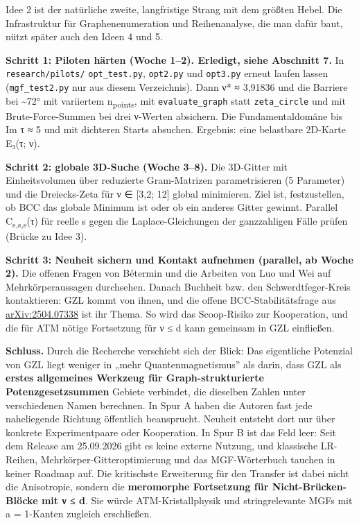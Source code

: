 Idee 2 ist der natürliche zweite, langfristige Strang mit dem größten Hebel. Die Infrastruktur für Graphenenumeration und Reihenanalyse, die man dafür baut, nützt später auch den Ideen 4 und 5.

\textbf{Schritt 1: Piloten härten (Woche 1--2). Erledigt, siehe Abschnitt 7.} In \texttt{research/pilots/} \texttt{opt\_test.py}, \texttt{opt2.py} und \texttt{opt3.py} erneut laufen lassen (\texttt{mgf\_test2.py} nur aus diesem Verzeichnis). Dann ν* ≈ 3,91836 und die Barriere bei \textasciitilde72° mit variiertem n\textsubscript{points}, mit \texttt{evaluate\_graph} statt \texttt{zeta\_circle} und mit Brute-Force-Summen bei drei ν-Werten absichern. Die Fundamentaldomäne bis Im τ ≈ 5 und mit dichteren Starts absuchen. Ergebnis: eine belastbare 2D-Karte E₃(τ; ν).

\textbf{Schritt 2: globale 3D-Suche (Woche 3--8).} Die 3D-Gitter mit Einheitsvolumen über reduzierte Gram-Matrizen parametrisieren (5 Parameter) und die Dreiecks-Zeta für ν ∈ {[}3,2; 12{]} global minimieren. Ziel ist, festzustellen, ob BCC das globale Minimum ist oder ob ein anderes Gitter gewinnt. Parallel C\textsubscript{s,s,s}(τ) für reelle s gegen die Laplace-Gleichungen der ganzzahligen Fälle prüfen (Brücke zu Idee 3).

\textbf{Schritt 3: Neuheit sichern und Kontakt aufnehmen (parallel, ab Woche 2).} Die offenen Fragen von Bétermin und die Arbeiten von Luo und Wei auf Mehrkörperaussagen durchsehen. Danach Buchheit bzw. den Schwerdtfeger-Kreis kontaktieren: GZL kommt von ihnen, und die offene BCC-Stabilitätsfrage aus \href{https://arxiv.org/abs/2504.07338}{arXiv:2504.07338} ist ihr Thema. So wird das Scoop-Risiko zur Kooperation, und die für ATM nötige Fortsetzung für ν ≤ d kann gemeinsam in GZL einfließen.

\textbf{Schluss.} Durch die Recherche verschiebt sich der Blick: Das eigentliche Potenzial von GZL liegt weniger in „mehr Quantenmagnetismus'' als darin, dass GZL als \textbf{erstes allgemeines Werkzeug für Graph-strukturierte Potenzgesetzsummen} Gebiete verbindet, die dieselben Zahlen unter verschiedenen Namen berechnen. In Spur A haben die Autoren fast jede naheliegende Richtung öffentlich beansprucht. Neuheit entsteht dort nur über konkrete Experimentpaare oder Kooperation. In Spur B ist das Feld leer: Seit dem Release am 25.09.2026 gibt es keine externe Nutzung, und klassische LR-Reihen, Mehrkörper-Gitteroptimierung und das MGF-Wörterbuch tauchen in keiner Roadmap auf. Die kritischste Erweiterung für den Transfer ist dabei nicht die Anisotropie, sondern die \textbf{meromorphe Fortsetzung für Nicht-Brücken-Blöcke mit ν ≤ d}. Sie würde ATM-Kristallphysik und stringrelevante MGFs mit a = 1-Kanten zugleich erschließen.

